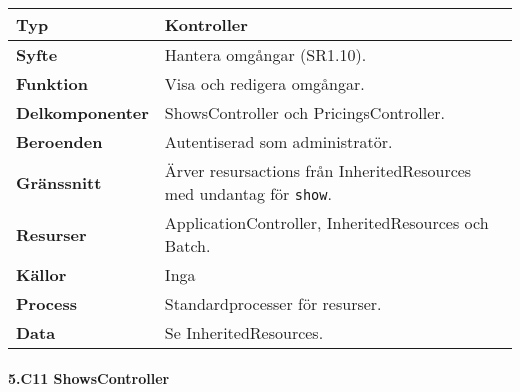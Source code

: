 \documentclass[a4paper, twoside, 11pt, titlepage]{article}
\begin{document}
			\begin {table} [ht] \begin{tabular} {  p{3.5cm} p{11.6cm} }
				\hline
				{\sffamily\textbf{Typ}} & {Kontroller} \\
				\hline
				{\sffamily\textbf{Syfte}} & {Hantera omgångar (SR1.10).} \\
				\hline
				{\sffamily\textbf{Funktion}} & {Visa och redigera omgångar.} \\
				\hline
				{\sffamily\textbf{Delkomponenter}} & {ShowsController och PricingsController.} \\
				\hline
				{\sffamily\textbf{Beroenden}} & {Autentiserad som administratör.} \\
				\hline
				{\sffamily\textbf{Gränssnitt}} & {Ärver resursactions från InheritedResources med undantag för {\tt show}.} \\
				\hline
				{\sffamily\textbf{Resurser}} & {ApplicationController, InheritedResources och Batch.} \\
				\hline
				{\sffamily\textbf{Källor}} & {Inga} \\
				\hline
				{\sffamily\textbf{Process}} & {Standardprocesser för resurser.} \\
				\hline
				{\sffamily\textbf{Data}} & {Se InheritedResources.} \\
				\hline
			\end{tabular} \end{table} \FloatBarrier


			\clearpage %
			\paragraph{5.C11 ShowsController}\
\end{document}
